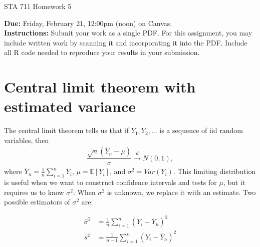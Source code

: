 \documentclass[11pt]{article}
\begin{document}
\begin{center}
\Large
STA 711 Homework 5\\
\normalsize
\vspace{5mm}
\end{center}

\noindent \textbf{Due:} Friday, February 21, 12:00pm (noon) on Canvas.\\ 

\noindent \textbf{Instructions:} Submit your work as a single PDF. For this assignment, you may include written work by scanning it and incorporating it into the PDF. Include all R code needed to reproduce your results in your submission.



\section*{Central limit theorem with estimated variance}

The central limit theorem tells us that if $Y_1, Y_2,...$ is a sequence of iid random variables, then
\begin{align*}
\dfrac{\sqrt{n}(\overline{Y}_n - \mu)}{\sigma} \overset{d}{\to} N(0, 1),
\end{align*}
where $\overline{Y}_n = \frac{1}{n} \sum \limits_{i=1}^n Y_i$, $\mu = \mathbb{E}[Y_i]$, and $\sigma^2 = Var(Y_i)$. This limiting distribution is useful when we want to construct confidence intervals and tests for $\mu$, but it requires us to know $\sigma^2$. When $\sigma^2$ is unknown, we replace it with an estimate. Two possible estimators of $\sigma^2$ are:

\begin{align*}
\widehat{\sigma}^2 &= \frac{1}{n} \sum \limits_{i=1}^n (Y_i - \overline{Y}_n)^2 \\
s^2 &= \frac{1}{n-1} \sum \limits_{i=1}^n (Y_i - \overline{Y}_n)^2
\end{align*}
\end{document}
